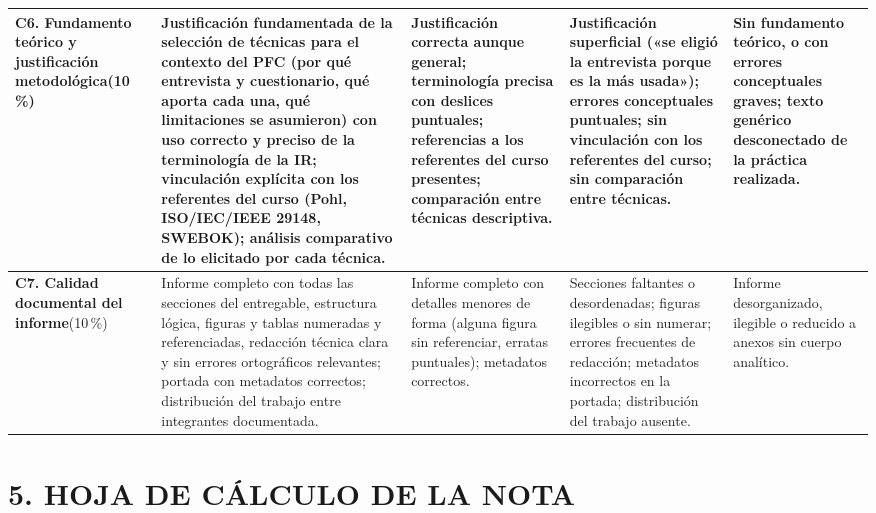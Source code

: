 \documentclass[11pt]{article}
\begin{document}
\begin{landscape}
{\begin{longtable}{|L{3.3cm}|L{4.75cm}|L{4.75cm}|L{4.75cm}|L{4.75cm}|}
\textbf{C6. Fundamento teórico y justificación metodológica}\newline{}(10\,\%) &
Justificación fundamentada de la selección de técnicas para el contexto del PFC (por qué entrevista y cuestionario, qué aporta cada una, qué limitaciones se asumieron) con uso correcto y preciso de la terminología de la IR; vinculación explícita con los referentes del curso (Pohl, ISO/IEC/IEEE 29148, SWEBOK); análisis comparativo de lo elicitado por cada técnica. &
Justificación correcta aunque general; terminología precisa con deslices puntuales; referencias a los referentes del curso presentes; comparación entre técnicas descriptiva. &
Justificación superficial («se eligió la entrevista porque es la más usada»); errores conceptuales puntuales; sin vinculación con los referentes del curso; sin comparación entre técnicas. &
Sin fundamento teórico, o con errores conceptuales graves; texto genérico desconectado de la práctica realizada.\\
\hline

\textbf{C7. Calidad documental del informe}\newline{}(10\,\%) &
Informe completo con todas las secciones del entregable, estructura lógica, figuras y tablas numeradas y referenciadas, redacción técnica clara y sin errores ortográficos relevantes; portada con metadatos correctos; distribución del trabajo entre integrantes documentada. &
Informe completo con detalles menores de forma (alguna figura sin referenciar, erratas puntuales); metadatos correctos. &
Secciones faltantes o desordenadas; figuras ilegibles o sin numerar; errores frecuentes de redacción; metadatos incorrectos en la portada; distribución del trabajo ausente. &
Informe desorganizado, ilegible o reducido a anexos sin cuerpo analítico.\\
\hline

\end{longtable}
}

\end{landscape}

\section*{\textcolor{utegreendk}{5. HOJA DE CÁLCULO DE LA NOTA}}
\end{document}
